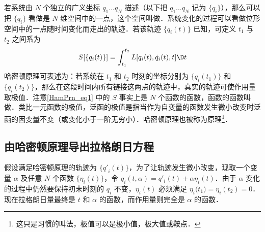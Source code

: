 

若系统由 $N$ 个独立的广义坐标 $q_1\dots q_N$ 描述（以下把 $q_1\dots q_N$ 记为 $\{q_i\}$），那么可以把 $\{q_i\}$ 看做是 $N$ 维空间中的一点，这个空间叫做．系统变化的过程可以看做位形空间中的一点随时间变化而走出的轨迹．若该轨迹 $\{ {{q_i}(t)} \}$ 已知，可定义 $t_1$ 与 $t_2$ 之间系为
\begin{equation}\label{HamPrn_eq1}
S[\{ {{q_i}(t)} \}] = \int_{t_1}^{t_2} {L[{q_i}(t),{{\dot q}_i}(t),t]\D t} 
\end{equation}
哈密顿原理可表述为：若系统在 $t_1$ 和 $t_2$ 时刻的坐标分别为 $\{ {{q_i}({t_1})} \}$ 和 $\{ {{q_i}({t_2})} \}$，那么在这段时间内所有链接这两点的轨迹中，真实的轨迹可使作用量取极值．注意\autoref{HamPrn_eq1} 中的 $S$ 事实上是 $N$ 个函数的函数，函数的函数叫做．类比一元函数的极值，泛函的极值是指当作为自变量的函数发生微小改变时泛函的因变量不变（或变化小于一阶无穷小）．哈密顿原理也被称为原理\footnote{这只是习惯的叫法，极值可以是极小值，极大值或鞍点．}．%

\subsection{由哈密顿原理导出拉格朗日方程}

假设满足哈密顿原理的轨迹为 $\{ {{{q'}_i}(t)} \}$，为了让轨迹发生微小改变，现取一个变量 $\alpha$ 及任意 $N$ 个函数 $\{{\eta_i}(t)\}$，令 ${q_i}(t,\alpha ) = {q'_i}(t) + \alpha {\eta_i}(t)$．由于 $\alpha$ 变化的过程中仍然要保持初末时刻的 $q_i$ 不变，$\eta_i(t)$ 必须满足 ${\eta_i}{\text{(}}{t_1}) = {\eta_i}({t_2}) = 0$．现在拉格朗日量最终是 $t$ 和 $\alpha$ 的函数，而作用量则完全是 $\alpha$ 的函数．
 
